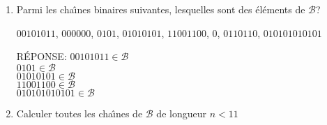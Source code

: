 \begin{enumerate}[\bf 1)]
\item{}Parmi les cha{\^\i}nes binaires suivantes, lesquelles sont des \'el\'ements de $\mathcal{B}$?

$0010 1011$, $000000$, $0101$, $01010101$, $11001100$, $0$, $0110110$, $010101010101$

\begin{framed}

RÉPONSE: $00101011 \in \mathcal{B}$ \\
        $0101 \in \mathcal{B}$ \\
        $01010101 \in \mathcal{B}$ \\
        $11001100 \in \mathcal{B}$ \\
        $010101010101 \in \mathcal{B}$ \\

\end{framed}

\item{} Calculer toutes les cha{\^\i}nes de $\mathcal{B}$ de longueur $n<11$

\begin{framed}


\end{framed}
\end{enumerate}
